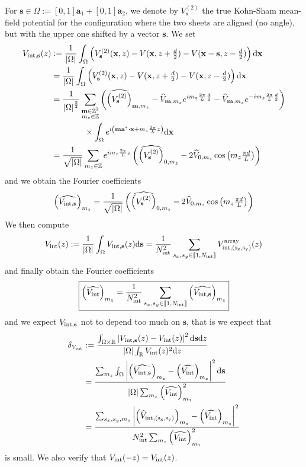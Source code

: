 \documentclass[11pt,a4paper,reqno,french,tikz]{amsart}
\def\d{{\rm d}}
\newcommand{\intent}[1]{\llbracket #1 \rrbracket}
\newcommand{\pa}[1]{\left( #1 \right)} %
\newcommand{\ab}[1]{\left|#1\right|} %
\newcommand{\f}[2]{\frac{#1}{#2}} %
\newcommand{\ind}[1]{_{\textup{#1}}} %
\def\ba{{\mathbf a}}
\def\bx{{\mathbf x}}
\def\bmm{{\mathbf m}}
\def\bs{{\mathbf s}}
\newcommand{\dd}{\tfrac{d}{2}}
\begin{document}
For $\bs \in \Omega := [0,1] \ba_1 + [0,1] \ba_2$, we denote by $V^{(2)}_{\bs}$ the true Kohn-Sham mean-field potential for the configuration where the two sheets are aligned (no angle), but with the upper one shifted by a vector $\bs$. We set
\begin{align*}
	V_{\rm int, \bs}(z) &:= \f{1}{\ab{\Omega}} \int_{\Omega}  \left( V^{(2)}_{\bs}(\bx, z) - V(\bx, z + \dd) - V(\bx - \bs, z -\dd)   \right) \d \bx \\
	&= \f{1}{\ab{\Omega}} \int_{\Omega}  \left( V^{(2)}_{\bs}(\bx, z) - V(\bx, z + \dd) - V(\bx, z -\dd)   \right) \d \bx \\
    &= \f{1}{\ab{\Omega}^{\f 32}} \sum_{\substack{\bmm \in \Z^2 \\ m_z \in \Z}}  \pa{ \widehat{\pa{V^{(2)}_{\bs}}}_{\bmm,m_z} - \widehat{V}_{\bmm,m_z}e^{i m_z \f{2\pi}{L} \f{d}{2}} -\widehat{V}_{\bmm,m_z} e^{-i m_z \f{2\pi}{L} \f{d}{2}}} \\
    &\qquad \qquad \times \int_{\Omega} e^{i \pa{\bmm \ba^* \cdot \bx + m_z \f{2\pi}{L} z}}\d \bx \\
    &= \f{1}{\sqrt{\ab{\Omega}}}\sum_{\substack{m_z \in \Z}} e^{i  m_z \f{2\pi}{L} z} \pa{ \widehat{\pa{V^{(2)}_{\bs}}}_{0,m_z} - 2 \widehat{V}_{0,m_z} \cos\pa{ m_z \tfrac{\pi d}{L} }}
\end{align*}
and we obtain the Fourier coefficients
\begin{align*}
\pa{\widehat{V_{\rm{int},\bs}}}_{m_z} =\f{1}{\sqrt{\ab{\Omega}}} \pa{\widehat{\pa{V^{(2)}_{\bs}}}_{0,m_z} - 2 \widehat{V}_{0,m_z} \cos\pa{ m_z \tfrac{\pi d}{L} }}
\end{align*}
We then compute
\begin{align*}
V\ind{int}(z) := \f{1}{\ab{\Omega}} \int_\Omega V_{\rm int, \bs}(z) \d \bs = \f{1}{N\ind{int}^2} \sum_{\substack{s_x,s_y \in \intent{1,N\ind{int}}}} V^{\rm{array}}_{\rm int, (s_x,s_y)}(z)
\end{align*}
and finally obtain the Fourier coefficients
\begin{align*}
\boxed{\pa{\widehat{V\ind{int}}}_{m_z} = \f{1}{N\ind{int}^2} \sum_{\substack{s_x,s_y \in \intent{1,N\ind{int}}}} \pa{\widehat{V_{\rm{int},\bs}}}_{m_z}}
\end{align*}
and we expect $V_{\rm{int},\bs}$ not to depend too much on $\bs$, that is we expect that
\begin{align*}
	\delta_{V\ind{int}} &:= \f{\int_{\Omega\times \R} \ab{V_{\rm{int},\bs}(z) - V\ind{int}(z)}^2 \d \bs \d z}{\ab{\Omega} \int_{\R} V\ind{int}(z)^2 \d z} \\
&= \f{\sum_{m_z} \int_{\Omega} \ab{\pa{\widehat{V_{\rm{int},\bs}}}_{m_z} - \pa{\widehat{V\ind{int}}}_{m_z}}^2 \d \bs }{\ab{\Omega} \sum_{m_z}  \pa{\widehat{V\ind{int}}}_{m_z}^2} \\
&= \f{\sum_{s_x,s_y,m_z} \ab{\pa{\widehat{V}_{\rm{int},(s_x,s_y)}}_{m_z} - \pa{\widehat{V\ind{int}}}_{m_z}}^2 }{N\ind{int}^2 \sum_{m_z}  \pa{\widehat{V\ind{int}}}_{m_z}^2}
\end{align*}
is small. We also verify that $V\ind{int}(-z) = V\ind{int}(z)$.
\end{document}
